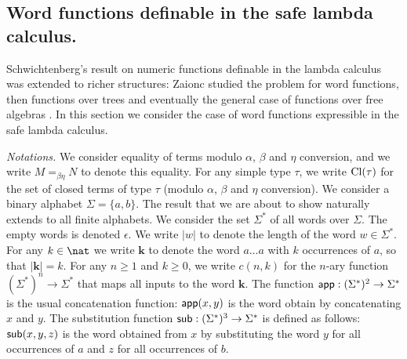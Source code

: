 \newcommand{\zaiwordtyp}{\mathbf{B}} %
\newcommand{\closedof}[1]{{\rm Cl}(#1)} %

\newcommand{\openedof}[2]{{\rm Op}(#1,#2)} %

\newcommand\wordnum[1]{\mathbf{#1}} %
\newcommand\safedefset{$\lambda^{safe}${\rm def}}

\newcommand\fatlambda{\lambda\kern-0.7em\lambda}
\newcommand\wordapp{{\sf app}}
\newcommand\wordsub{{\sf sub}}


\subsection{Word functions definable in the safe lambda calculus.}
Schwichtenberg's result on numeric functions definable in the lambda
calculus was extended to richer structures: Zaionc studied the
problem for word functions, then functions over trees and
eventually the general case of functions over free algebras
\cite{DBLP:journals/tcs/Leivant93,DBLP:journals/apal/Zaionc91,DBLP:conf/aluacs/Zaionc88,DBLP:journals/tcs/Zaionc87,
zaionc:csl94}. In this section we consider the case of word
functions expressible in the safe lambda calculus.
\smallskip

\emph{Notations.} We consider equality of terms modulo $\alpha$,
$\beta$ and $\eta$ conversion, and we write $M=_{\beta\eta} N$ to
denote this equality. For any simple type $\tau$, we write
$\closedof{\tau}$ for the set of closed terms of type $\tau$ (modulo
$\alpha$, $\beta$ and $\eta$ conversion). We consider a binary
alphabet $\Sigma = \{a,b\}$. The result that we are about to show naturally extends to all
finite alphabets. We consider the set $\Sigma^*$ of all words over
$\Sigma$. The empty words is denoted $\epsilon$. We write $|w|$ to
denote the length of the word $w\in\Sigma^*$. For any $k\in \nat$ we
write $\wordnum{k}$ to denote the word $a \ldots a$ with $k$
occurrences of $a$, so that $|\wordnum{k}| = k$. For any $n\geq 1$
and $k\geq 0$, we write $c(n,k)$ for the $n$-ary function
$(\Sigma^*)^n \rightarrow \Sigma^*$ that maps all inputs to the word
$\wordnum{k}$. The function $\wordapp : (\Sigma^*)^2 \rightarrow
\Sigma^*$ is the usual concatenation function: $\wordapp(x,y)$ is
the word obtain by concatenating $x$ and $y$. The substitution
function $\wordsub : (\Sigma^*)^3 \rightarrow \Sigma^*$ is defined
as follows: $\wordsub(x,y,z)$ is the word obtained from $x$ by
substituting the word $y$ for all occurrences of $a$ and $z$ for all
occurrences of $b$.

